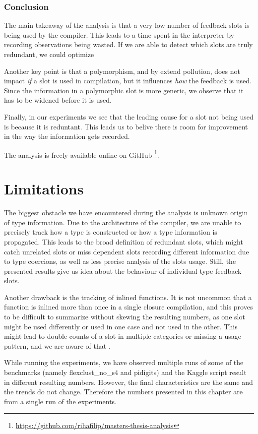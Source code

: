 \subsubsection*{Conclusion}

The main takeaway of the analysis is that a very low number of feedback slots is being used by the compiler. This leads to a time spent in the interpreter by recording observations being wasted. If we are able to detect which slots are truly redundant, we could optimize

Another key point is that a polymorphism, and by extend pollution, does not impact \textit{if} a slot is used in compilation, but it influences \textit{how} the feedback is used. Since the information in a polymorphic slot is more generic, we observe that it has to be widened before it is used.

Finally, in our experiments we see that the leading cause for a slot not being used is because it is reduntant. This leads us to belive there is room for improvement in the way the information gets recorded.

The analysis is freely available online on GitHub \footnote{\url{https://github.com/rihafilip/masters-thesis-analysis}}.

\section{Limitations}

The biggest obstacle we have encountered during the analysis is unknown origin of type information. Due to the architecture of the compiler, we are unable to precisely track how a type is constructed or how a type information is propagated. This leads to the broad definition of redundant slots, which might catch unrelated slots or miss dependent slots recording different information due to type coercions, as well as less precise analysis of the slots usage. Still, the presented results give us idea about the behaviour of individual type feedback slots.

Another drawback is the tracking of inlined functions. It is not uncommon that a function is inlined more than once in a single closure compilation, and this proves to be difficult to summarize without skewing the resulting numbers, as one slot might be used differently or used in one case and not used in the other. This might lead to double counts of a slot in multiple categories or missing a usage pattern, and we are aware of that .

While running the experiments, we have observed multiple runs of some of the benchmarks (namely flexclust\_no\_s4 and pidigits) and the Kaggle script result in different resulting numbers. However, the final characteristics are the same and the trends do not change. Therefore the numbers presented in this chapter are from a single run of the experiments.

